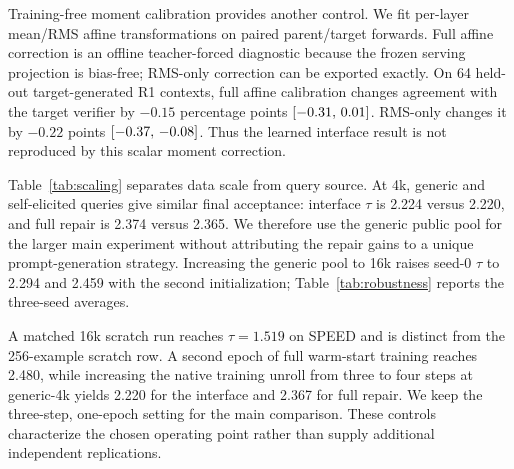 Training-free moment calibration provides another control. We fit per-layer mean/RMS affine transformations on paired parent/target forwards. Full affine correction is an offline teacher-forced diagnostic because the frozen serving projection is bias-free; RMS-only correction can be exported exactly. On 64 held-out target-generated R1 contexts, full affine calibration changes agreement with the target verifier by $-0.15$ percentage points $[-0.31,\,0.01]$. RMS-only changes it by $-0.22$ points $[-0.37,\,-0.08]$. Thus the learned interface result is not reproduced by this scalar moment correction.

\begin{table}[t]
\centering\small

\caption{\textbf{Query source and scale.} R1 SPEED-128 acceptance length with the second family initialization, seed~0. The 256-example runs use 300 steps; the 1k/4k/16k runs use one epoch. Generic and self-elicited corpora have different token counts, so source comparisons are matched by examples and epoch rather than token budget. All rows use target-generated answers.}
\label{tab:scaling}
\end{table}

Table~\ref{tab:scaling} separates data scale from query source. At 4k, generic and self-elicited queries give similar final acceptance: interface $\tau$ is 2.224 versus 2.220, and full repair is 2.374 versus 2.365. We therefore use the generic public pool for the larger main experiment without attributing the repair gains to a unique prompt-generation strategy. Increasing the generic pool to 16k raises seed-0 $\tau$ to 2.294 and 2.459 with the second initialization; Table~\ref{tab:robustness} reports the three-seed averages.

A matched 16k scratch run reaches $\tau=1.519$ on SPEED and is distinct from the 256-example scratch row. A second epoch of full warm-start training reaches 2.480, while increasing the native training unroll from three to four steps at generic-4k yields 2.220 for the interface and 2.367 for full repair. We keep the three-step, one-epoch setting for the main comparison. These controls characterize the chosen operating point rather than supply additional independent replications.

